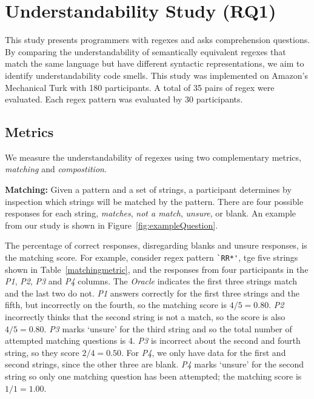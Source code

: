

\section{Understandability Study (RQ1)}
\label{sec:understandability}
This study presents  programmers with regexes and asks comprehension questions. By comparing the understandability of semantically equivalent regexes that match the same language but have different syntactic representations, we aim to identify understandability code smells.
This study was  implemented on Amazon's Mechanical Turk with 180 participants. A total of 35 pairs of regex were evaluated. Each regex pattern was evaluated by 30 participants.







\subsection{Metrics}
\label{sec:understadningmetric}
 We measure the understandability of regexes using two complementary metrics, \emph{matching} and \emph{compostition}.


\textbf{Matching:}
 Given a pattern and a set of strings, a participant determines by inspection which strings will be matched by the pattern. There are four possible responses for each string, \emph{matches}, \emph{not a match}, \emph{unsure}, or blank. An example from our study is shown in Figure~\ref{fig:exampleQuestion}.

 The percentage of correct responses, disregarding blanks and unsure responses, is the matching score.
 For example, consider regex pattern \verb!`RR*'!, tge five strings shown in Table~\ref{matchingmetric}, and the responses from four participants in the \emph{P1}, \emph{P2}, \emph{P3} and \emph{P4} columns.
 The {\em Oracle} indicates  the first three strings match and the last two do not. \emph{P1} answers correctly for the first three strings and the fifth, but incorrectly on the fourth, so the matching score is $4/5 = 0.80$. \emph{P2} incorrectly thinks that the second string is not a match, so the score is also $4/5 = 0.80$.  \emph{P3} marks `unsure' for the third string and so the total number of attempted matching questions is 4. \emph{P3} is incorrect about the second and fourth string, so they score $2/4 = 0.50$.  For \emph{P4}, we only have data for the first and second strings, since the other three are blank.  \emph{P4} marks `unsure' for the second string so only one matching question has been attempted;  the matching score is $1/1 = 1.00$.

